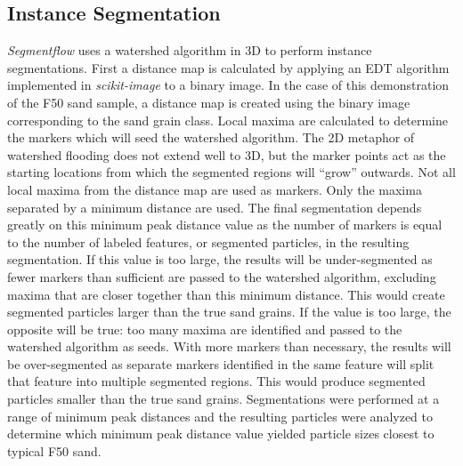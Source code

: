 \subsection{Instance Segmentation}
\textit{Segmentflow}
uses a watershed algorithm in 3D to perform instance
segmentations. First a distance map is calculated by applying an EDT algorithm
implemented in \textit{scikit-image} to a binary image.
In the case of this demonstration of the F50 sand sample, a distance map
is created using the binary image corresponding to the sand grain class.
Local maxima are calculated to determine the markers which will
seed the watershed algorithm.
The 2D metaphor of watershed flooding does not
extend well to 3D, but the marker points act as the starting locations from
which the segmented regions will ``grow'' outwards.
Not all local maxima from the distance map are used as markers. Only the
maxima separated by a minimum distance are used.
The final segmentation depends greatly on
this minimum peak distance value as the number of markers is equal to the
number of labeled features, or segmented particles, in the resulting
segmentation.
If this value is too large, the results will be under-segmented as
fewer markers than sufficient are passed to the watershed algorithm,
excluding maxima that are closer together than this minimum distance.
This would create segmented particles larger than the true sand grains.
If the value is too large, the opposite will be true: too many maxima are
identified and passed to the watershed algorithm as seeds. With more markers
than necessary, the results will be over-segmented as separate markers
identified in the same feature will split that feature into multiple segmented
regions. This would produce segmented particles smaller than the true sand
grains.
Segmentations were performed at a range of minimum peak distances and
the resulting particles were analyzed to determine which minimum peak
distance value yielded particle sizes closest to typical F50 sand.

